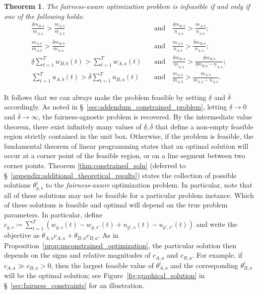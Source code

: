 \documentclass[letterpaper]{article} %
\newtheorem{theorem}{Theorem}
\begin{document}
\begin{theorem}\label{theorem:feasibility}
The fairness-aware optimization problem is infeasible if and only if one of the following holds:
\footnotesize
    \begin{align*}
    \frac{\underline{\delta}m_{B,b}}{\underline{m}_{A,a}} > \frac{m_{A,b}}{\underline{m}_{A,b}}\quad &\text{and}\quad \frac{\underline{\delta}m_{B,b}}{\underline{n}_{A,a}} > \frac{m_{A,b}}{\underline{n}_{A,b}}; \\
    \frac{m_{A,b}}{\overline{m}_{A,b}} > \frac{\overline{\delta}m_{B,b}}{\overline{m}_{A,a}}\quad &\text{and}\quad \frac{m_{A,b}}{\overline{n}_{A,b}} > \frac{\overline{\delta} m_{B,b}}{\overline{n}_{A,a}}; \\
    \underline{\delta} \sum_{t=1}^T w_{B,b}(t) > \sum_{t=1}^T w_{A,a}(t)\quad &\text{and}\quad \frac{\underline{\delta} m_{B,b}}{\underline{m}_{A,a}} > \frac{\underline{\delta} m_{B,b}}{\underline{\delta} m_{B,b} - \underline{n}_{A,a}} ; \\
    \sum_{t=1}^T u_{A,b}(t) > \overline{\delta} \sum_{t=1}^T u_{B,a}(t)\quad &\text{and}\quad \frac{m_{A,b}}{\overline{m}_{A,b}} > \frac{m_{A,b}}{m_{A,b} - \overline{n}_{A,b}}.
\end{align*}
\end{theorem}
%
It follows that we can always make the problem feasible by setting $\underline{\delta}$ and $\overline{\delta}$ accordingly.
%
As noted in \S~\ref{sec:addendum_constrained_problem}, letting $\underline{\delta} \to 0$ and $\overline{\delta} \to \infty$, the fairness-agnostic problem is recovered.
%
By the intermediate value theorem, there exist infinitely many values of $\underline{\delta},\overline{\delta}$ that define a non-empty feasible region strictly contained in the unit box.
%
Otherwise, if the problem is feasible, the fundamental theorem of linear programming states that an optimal solution will occur at a corner point of the feasible region, or on a line segment between two corner points.
%
Theorem \ref{thm:constrained_soln} (deferred to \S~\ref{appendix:additional_theoretical_results}) states the collection of possible solutions $\theta_{g,s}^i$ to the \emph{fairness-aware} optimization problem.
%
In particular, note that all of these solutions may not be feasible for a particular problem instance.
%
Which of these solutions is feasible and optimal will depend on the true problem parameters.
%
In particular, define $c_{g,s} \coloneqq \sum_{t=1}^T (w_{g,s}(t) - w_{g,s'}(t) + u_{g',s}(t) - u_{g',s'}(t))$ and write the objective as $\theta_{A,a}c_{A,a} + \theta_{B,a}c_{B,a}$.
%
As in Proposition~\ref{prop:unconstrained_optimization}, the particular solution then depends on the signs and relative magnitudes of $c_{A,a}$ and $c_{B,a}$.
%
For example, if $c_{A,a} \gg c_{B,a} > 0$, then the largest feasible value of $\theta_{A,a}^i$ and the corresponding $\theta_{B,a}^i$ will be the optimal solution; see Figure~\ref{fig:graphical_solution} in \S~\ref{sec:fairness_constraints} for an illustration.
\end{document}
